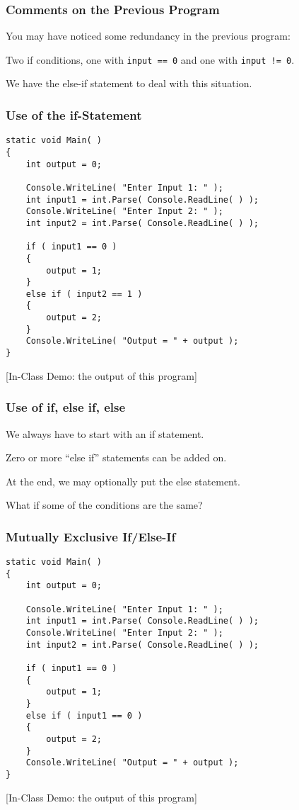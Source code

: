 \begin{frame}
\frametitle{Comments on the Previous Program}

You may have noticed some redundancy in the previous program:


Two if conditions, one with \texttt{input == 0} and one with \texttt{input != 0}.

We have the else-if statement to deal with this situation.

\end{frame}

\begin{frame}[fragile]
\frametitle{Use of the if-Statement}

{\scriptsize
\begin{verbatim}
static void Main( )
{
    int output = 0;

    Console.WriteLine( "Enter Input 1: " ); 
    int input1 = int.Parse( Console.ReadLine( ) );
    Console.WriteLine( "Enter Input 2: " ); 
    int input2 = int.Parse( Console.ReadLine( ) );

    if ( input1 == 0 )
    {
        output = 1; 
    } 
    else if ( input2 == 1 )		
    {				
        output = 2; 			
    }				
    Console.WriteLine( "Output = " + output );
}
\end{verbatim}
}

[In-Class Demo: the output of this program]

\end{frame}

\begin{frame}
\frametitle{Use of if, else if, else}

We always have to start with an if statement.

Zero or more ``else if'' statements can be added on.

At the end, we may optionally put the else statement.

What if some of the conditions are the same?

\end{frame}

\begin{frame}[fragile]
\frametitle{Mutually Exclusive If/Else-If}

{\scriptsize
\begin{verbatim}
static void Main( )
{
    int output = 0;

    Console.WriteLine( "Enter Input 1: " ); 
    int input1 = int.Parse( Console.ReadLine( ) );
    Console.WriteLine( "Enter Input 2: " ); 
    int input2 = int.Parse( Console.ReadLine( ) );

    if ( input1 == 0 )
    {
        output = 1; 
    } 
    else if ( input1 == 0 )		
    {				
        output = 2; 			
    }				
    Console.WriteLine( "Output = " + output );
}
\end{verbatim}
}

[In-Class Demo: the output of this program]

\end{frame}


